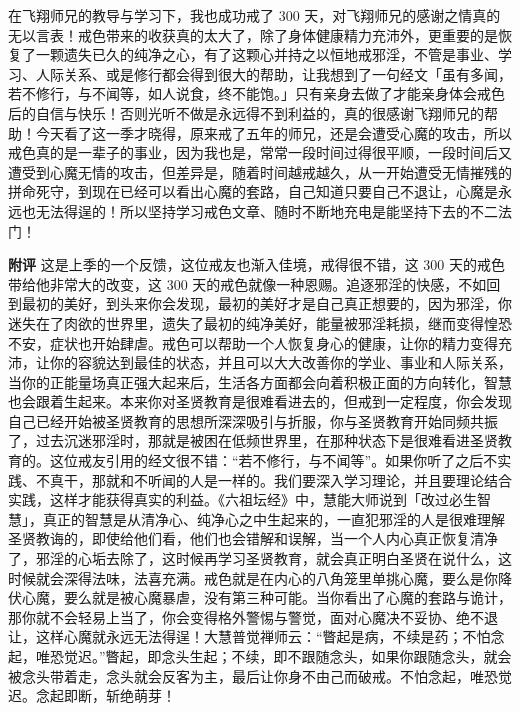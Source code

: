 \begin{case}
    在飞翔师兄的教导与学习下，我也成功戒了 300 天，对飞翔师兄的感谢之情真的无以言表！戒色带来的收获真的太大了，除了身体健康精力充沛外，更重要的是恢复了一颗遗失已久的纯净之心，有了这颗心并持之以恒地戒邪淫，不管是事业、学习、人际关系、或是修行都会得到很大的帮助，让我想到了一句经文「虽有多闻，若不修行，与不闻等，如人说食，终不能饱。」只有亲身去做了才能亲身体会戒色后的自信与快乐！否则光听不做是永远得不到利益的，真的很感谢飞翔师兄的帮助！今天看了这一季才晓得，原来戒了五年的师兄，还是会遭受心魔的攻击，所以戒色真的是一辈子的事业，因为我也是，常常一段时间过得很平顺，一段时间后又遭受到心魔无情的攻击，但差异是，随着时间越戒越久，从一开始遭受无情摧残的拼命死守，到现在已经可以看出心魔的套路，自己知道只要自己不退让，心魔是永远也无法得逞的！所以坚持学习戒色文章、随时不断地充电是能坚持下去的不二法门！

    \textbf{附评} 这是上季的一个反馈，这位戒友也渐入佳境，戒得很不错，这 300 天的戒色带给他非常大的改变，这 300 天的戒色就像一种恩赐。追逐邪淫的快感，不如回到最初的美好，到头来你会发现，最初的美好才是自己真正想要的，因为邪淫，你迷失在了肉欲的世界里，遗失了最初的纯净美好，能量被邪淫耗损，继而变得惶恐不安，症状也开始肆虐。戒色可以帮助一个人恢复身心的健康，让你的精力变得充沛，让你的容貌达到最佳的状态，并且可以大大改善你的学业、事业和人际关系，当你的正能量场真正强大起来后，生活各方面都会向着积极正面的方向转化，智慧也会跟着生起来。本来你对圣贤教育是很难看进去的，但戒到一定程度，你会发现自己已经开始被圣贤教育的思想所深深吸引与折服，你与圣贤教育开始同频共振了，过去沉迷邪淫时，那就是被困在低频世界里，在那种状态下是很难看进圣贤教育的。这位戒友引用的经文很不错：“若不修行，与不闻等”。如果你听了之后不实践、不真干，那就和不听闻的人是一样的。我们要深入学习理论，并且要理论结合实践，这样才能获得真实的利益。《六祖坛经》中，慧能大师说到「改过必生智慧」，真正的智慧是从清净心、纯净心之中生起来的，一直犯邪淫的人是很难理解圣贤教诲的，即使给他们看，他们也会错解和误解，当一个人内心真正恢复清净了，邪淫的心垢去除了，这时候再学习圣贤教育，就会真正明白圣贤在说什么，这时候就会深得法味，法喜充满。戒色就是在内心的八角笼里单挑心魔，要么是你降伏心魔，要么就是被心魔暴虐，没有第三种可能。当你看出了心魔的套路与诡计，那你就不会轻易上当了，你会变得格外警惕与警觉，面对心魔决不妥协、绝不退让，这样心魔就永远无法得逞！大慧普觉禅师云：“瞥起是病，不续是药；不怕念起，唯恐觉迟。”瞥起，即念头生起；不续，即不跟随念头，如果你跟随念头，就会被念头带着走，念头就会反客为主，最后让你身不由己而破戒。不怕念起，唯恐觉迟。念起即断，斩绝萌芽！
\end{case}

